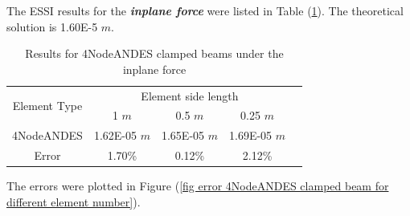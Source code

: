 \documentclass[fleqn,11pt]{article}
\begin{document}
The ESSI results for the \textbf{\emph{inplane force}} were listed in Table (\ref{table Results for 4NodeANDES clamped beams with more elements 2}). 
The theoretical solution is 1.60E-5 $m$. 

\begin{table}[H]
  \centering
      \caption{Results for 4NodeANDES clamped beams under the inplane force}
  \label{table Results for 4NodeANDES clamped beams with more elements 2}
  \begin{tabular}{|c|c|c|c|c|}
    \hline 
    \multirow{2}{*}{Element Type} 
       & \multicolumn{3}{|c|}{Element side length} \\ \cline{2-4}
       & 1 $m$ & 0.5 $m$ & 0.25 $m$ \\                              \hline
4NodeANDES  & 1.62E-05 $m$ & 1.65E-05 $m$ & 1.69E-05 $m$ \\ \hline
Error       & 1.70\%   & 0.12\%   & 2.12\%       \\         \hline
  \end{tabular}
\end{table}



The errors were plotted in Figure (\ref{fig error 4NodeANDES clamped beam for different element number}).
\end{document}
